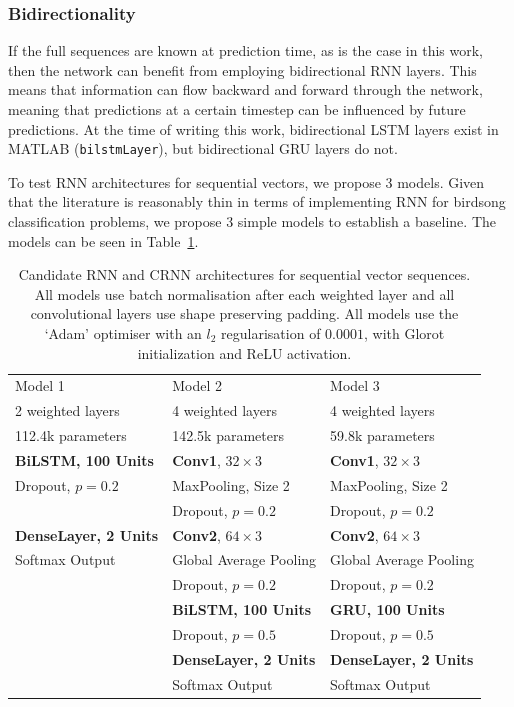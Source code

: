 \subsubsection{Bidirectionality}

If the full sequences are known at prediction time, as is the case in this work,
then the network can benefit from employing bidirectional RNN layers. This means
that information can flow backward and forward through the network, meaning that
predictions at a certain timestep can be influenced by future predictions. At
the time of writing this work, bidirectional LSTM layers exist in MATLAB
(\texttt{bilstmLayer}), but bidirectional GRU layers do not.

To test RNN architectures for sequential vectors, we propose 3 models.
Given that the literature is reasonably thin in terms of implementing RNN for
birdsong classification problems, we propose 3 simple models to establish a
baseline. The models can be seen in Table~\ref{table:rnn_seq_vector}.

\begin{table}[ht]
\begin{center}
\begin{tabular}{l l l}
\toprule
Model 1 & Model 2 & Model 3 \\ [0.5ex]
2 weighted layers & 4 weighted layers & 4 weighted layers \\[0.5ex]
112.4k parameters & 142.5k parameters & 59.8k parameters \\[0.5ex]
\midrule
\textbf{BiLSTM, 100 Units} & \textbf{Conv1}, $32 \times 3$ & \textbf{Conv1}, $32 \times 3$ \\
Dropout, $p=0.2$ & MaxPooling, Size 2 & MaxPooling, Size 2 \\
& Dropout, $p=0.2$ & Dropout, $p=0.2$ \\[1ex]
\textbf{DenseLayer, 2 Units} & \textbf{Conv2}, $64 \times 3$ & \textbf{Conv2}, $64 \times 3$ \\
Softmax Output & Global Average Pooling & Global Average Pooling \\
& Dropout, $p=0.2$ & Dropout, $p=0.2$ \\[1ex]
& \textbf{BiLSTM, 100 Units} & \textbf{GRU, 100 Units} \\
& Dropout, $p=0.5$  & Dropout, $p=0.5$  \\[1ex]
& \textbf{DenseLayer, 2 Units} & \textbf{DenseLayer, 2 Units} \\
& Softmax Output & Softmax Output \\
\bottomrule
\end{tabular}
\caption{Candidate RNN and CRNN architectures for sequential vector sequences.
  All models use batch normalisation after each weighted layer and all
  convolutional layers use shape preserving padding. All models use the `Adam'
  optimiser with an $l_2$ regularisation of $0.0001$, with Glorot initialization
and ReLU activation.}\label{table:rnn_seq_vector}
\end{center}
\end{table}

